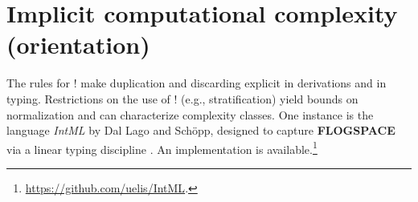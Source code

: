 \section{Implicit computational complexity (orientation)}
\label{sec:icc-orientation}
The rules for ${!}$ make duplication and discarding explicit in derivations and in typing. Restrictions on the use of ${!}$ (e.g., stratification) yield bounds on normalization and can characterize complexity classes. One instance is the language \emph{IntML} by Dal Lago and Sch\"opp, designed to capture \textbf{FLOGSPACE} via a linear typing discipline \cite{DALLAGO2016150}. An implementation is available.\footnote{\url{https://github.com/uelis/IntML}.}
